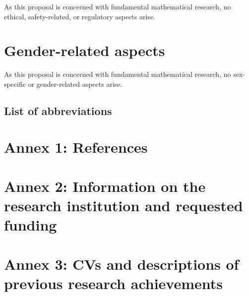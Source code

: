\documentclass[a4paper,11pt]{scrartcl}
\begin{document}
As this proposal is concerned with fundamental mathematical research, no ethical, safety-related, or regulatory aspects arise.

\section{Gender-related aspects}\label{sec:gender}

As this proposal is concerned with fundamental mathematical research, no sex-specific or gender-related aspects arise.


\newpage

\subsection{List of abbreviations}

\printacronyms[heading=none, display=all]

\newpage
\section*{Annex 1: References}

\printbibliography[heading=none]

\newpage
\section*{Annex 2: Information on the research institution and requested funding}


\newpage
\section*{Annex 3: CVs and descriptions of previous research achievements}


\end{document}
